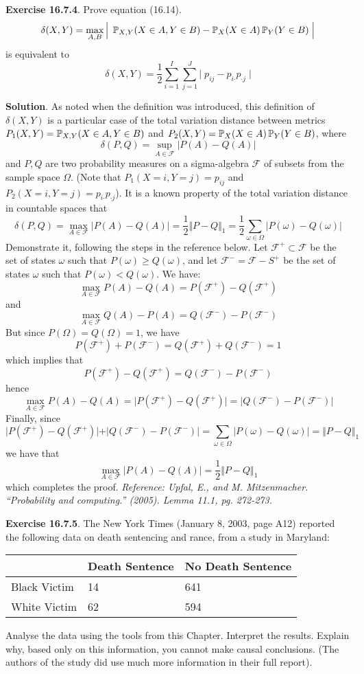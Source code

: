 \textbf{Exercise 16.7.4}. Prove equation (16.14).
\[
\delta(X, Y) = \max_{A, B} \Big|\; \operatorname{\mathbb{P}}_{X, Y}(X \in A, Y \in B) - \operatorname{\mathbb{P}}_X(X \in A) \operatorname{\mathbb{P}}_Y(Y \in B) \;\Big|
\]
is equivalent to
\[
\delta(X, Y) = \frac{1}{2} \sum_{i=1}^I \sum_{j=1}^J \Big|\; p_{ij} - p_{i\text{·}} p_{\text{·}j} \;\Big|
\]

\textbf{Solution}.
As noted when the definition was introduced, this definition of
\(\delta(X, Y)\) is a particular case of the total variation distance
between metrics \(P_{1}(X, Y) = \operatorname{\mathbb{P}}_{X, Y}(X \in A, Y \in B)\) and
\(P_{2}(X, Y) = \operatorname{\mathbb{P}}_X(X \in A) \operatorname{\mathbb{P}}_Y(Y \in B)\), where
\[
\delta(P, Q) = \sup_{A \in \mathcal{F}} |P(A) - Q(A)|
\]
and \(P, Q\) are two probability measures on a sigma-algebra
\(\mathcal{F}\) of subsets from the sample space \(\Omega\).
(Note that \(P_{1}(X = i, Y = j) = p_{ij}\) and
\(P_{2}(X = i, Y = j) =  p_{i\text{·}} p_{\text{·}j}\)).
It is a known property of the total variation distance in countable
spaces that
\[
\delta(P, Q) = \max_{A \in \mathcal{F}} |P(A) - Q(A)| = \frac{1}{2} \Vert P - Q \Vert_{1} = \frac{1}{2} \sum_{\omega \in \Omega} \vert P(\omega) - Q(\omega) \vert
\]
Demonstrate it, following the steps in the reference below.
Let \(\mathcal{F}^+ \subset \mathcal{F}\) be the set of states
\(\omega\) such that \(P(\omega) \geq Q(\omega)\), and let
\(\mathcal{F}^- = \mathcal{F} - S^+\) be the set of states \(\omega\)
such that \(P(\omega) < Q(\omega)\). We have:
\[
\max_{A \in \mathcal{F}} P(A) - Q(A) = P(\mathcal{F}^+) - Q(\mathcal{F}^+)
\]
and
\[
\max_{A \in \mathcal{F}} Q(A) - P(A) = Q(\mathcal{F}^-) - P(\mathcal{F}^-)
\]
But since \(P(\Omega) = Q(\Omega) = 1\), we have
\[
P(\mathcal{F}^+) + P(\mathcal{F}^-) = Q(\mathcal{F}^+) + Q(\mathcal{F}^-) = 1
\]
which implies that
\[
P(\mathcal{F}^+) - Q(\mathcal{F}^+) = Q(\mathcal{F}^-) - P(\mathcal{F}^-)
\]
hence
\[
\max_{A \in \mathcal{F}} P(A) - Q(A) = \vert P(\mathcal{F}^+) - Q(\mathcal{F}^+) \vert = \vert Q(\mathcal{F}^-) - P(\mathcal{F}^-) \vert
\]
Finally, since
\[
\vert P(\mathcal{F}^+) - Q(\mathcal{F}^+) \vert + \vert Q(\mathcal{F}^-) - P(\mathcal{F}^-) \vert = \sum_{\omega \in \Omega} | P(\omega) - Q(\omega) | = \Vert P - Q \Vert_{1}
\]
we have that
\[
\max_{A \in \mathcal{F}} |P(A) - Q(A)| = \frac{1}{2} \Vert P - Q \Vert_{1}
\]
which completes the proof.
\emph{Reference: Upfal, E., and M. Mitzenmacher. ``Probability and
computing.'' (2005). Lemma 11.1, pg. 272-273.}

\textbf{Exercise 16.7.5}. The New York Times (January 8, 2003, page A12)
reported the following data on death sentencing and rance, from a study
in Maryland:
\begin{table}[H]
\centering
\begin{tabular}{@{}lll@{}}
\toprule
& Death Sentence & No Death Sentence \\
\midrule
Black Victim & 14 & 641 \\
White Victim & 62 & 594 \\
\bottomrule
\end{tabular}
\end{table}
Analyse the data using the tools from this Chapter. Interpret the
results. Explain why, based only on this information, you cannot make
causal conclusions. (The authors of the study did use much more
information in their full report).

